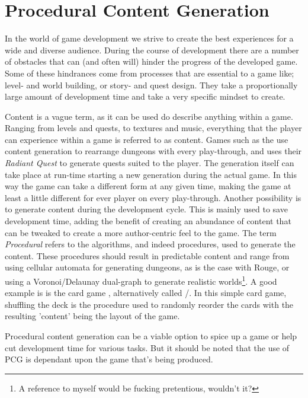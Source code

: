 \chapter{Procedural Content Generation}
In the world of game development we strive to create the best experiences for a wide and diverse audience.
During the course of development there are a number of obstacles that can (and often will) hinder the progress of the developed game.
Some of these hindrances come from processes that are essential to a game like; level- and world building, or story- and quest design.
They take a proportionally large amount of development time and take a very specific mindset to create.

Content is a vague term, as it can be used do describe anything within a game.
Ranging from levels and quests, to textures and music, everything that the player can experience within a game is referred to as content.
Games such as the  use content generation to rearrange dungeons with every play-through, and  uses their \textit{Radiant Quest} to generate quests suited to the player.
The generation itself can take place at run-time starting a new generation during the actual game.
In this way the game can take a different form at any given time, making the game at least a little different for ever player on every play-through. 
Another possibility is to generate content during the development cycle.
This is mainly used to save development time, adding the benefit of creating an abundance of content that can be tweaked to create a more author-centric feel to the game.
The term \textit{Procedural} refers to the algorithms, and indeed procedures, used to generate the content.
These procedures should result in predictable content and range from using cellular automata for generating dungeons, as is the case with Rouge, or using a Voronoi/Delaunay dual-graph to generate realistic worlds\footnote{A reference to myself would be fucking pretentious, wouldn't it?}.
A good example is is the card game , alternatively called /.
In this simple card game, shuffling the deck is the procedure used to randomly reorder the cards with the resulting 'content' being the layout of the game.

Procedural content generation can be a viable option to spice up a game or help cut development time for various tasks.
But it should be noted that the use of PCG is dependant upon the game that's being produced.

